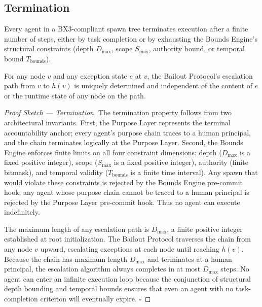 \subsection{Termination}

\begin{property}
\label{prop:termination}
Every agent in a BX3-compliant spawn tree terminates execution after a finite number of steps, either by task completion or by exhausting the Bounds Engine's structural constraints (depth $D_{\max}$, scope $S_{\max}$, authority bound, or temporal bound $T_{\text{bounds}}$).
\end{property}

\begin{property}
\label{prop:deterministic-escalation}
For any node $v$ and any exception state $e$ at $v$, the Bailout Protocol's escalation path from $v$ to $h(v)$ is uniquely determined and independent of the content of $e$ or the runtime state of any node on the path.
\end{property}

\begin{proof}[Proof Sketch --- Termination]
The termination property follows from two architectural invariants. First, the Purpose Layer represents the terminal accountability anchor; every agent's purpose chain traces to a human principal, and the chain terminates logically at the Purpose Layer. Second, the Bounds Engine enforces finite limits on all four constraint dimensions: depth ($D_{\max}$ is a fixed positive integer), scope ($S_{\max}$ is a fixed positive integer), authority (finite bitmask), and temporal validity ($T_{\text{bounds}}$ is a finite time interval). Any spawn that would violate these constraints is rejected by the Bounds Engine pre-commit hook; any agent whose purpose chain cannot be traced to a human principal is rejected by the Purpose Layer pre-commit hook. Thus no agent can execute indefinitely.

The maximum length of any escalation path is $D_{\max}$, a finite positive integer established at root initialization. The Bailout Protocol traverses the chain from any node $v$ upward, escalating exceptions at each node until reaching $h(v)$. Because the chain has maximum length $D_{\max}$ and terminates at a human principal, the escalation algorithm always completes in at most $D_{\max}$ steps. No agent can enter an infinite execution loop because the conjunction of structural depth bounding and temporal bounds ensures that even an agent with no task-completion criterion will eventually expire. $\square$
\end{proof}


